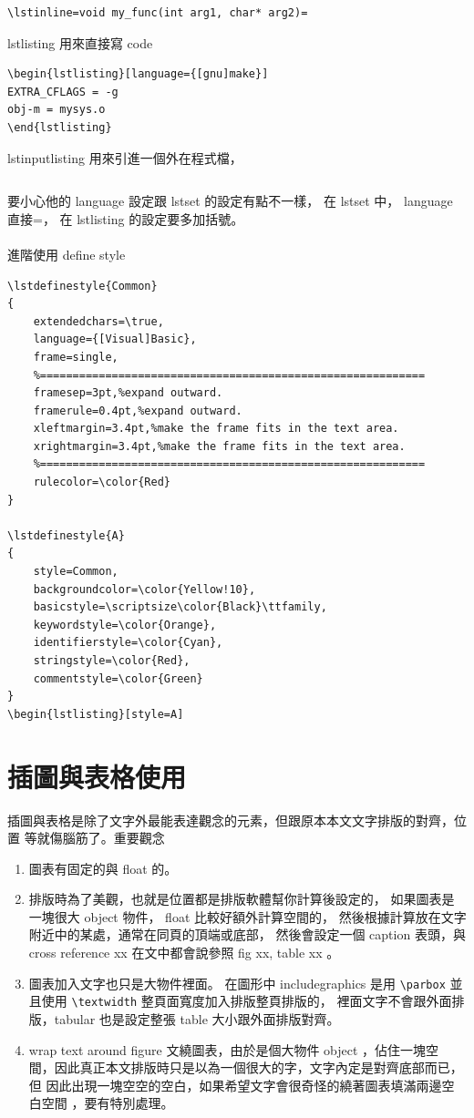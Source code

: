 \begin{verbatim}
\lstinline=void my_func(int arg1, char* arg2)=
\end{verbatim}
lstlisting 用來直接寫 code
\begin{verbatim}
\begin{lstlisting}[language={[gnu]make}]
EXTRA_CFLAGS = -g
obj-m = mysys.o
\end{lstlisting}
\end{verbatim}
lstinputlisting 用來引進一個外在程式檔，
\begin{verbatim}

\end{verbatim}
要小心他的 language 設定跟 lstset 的設定有點不一樣， 在 lstset 中，
language 直接=， 在 lstlisting 的設定要多加括號。
\\\\
進階使用 define style
\begin{verbatim}
\lstdefinestyle{Common}
{
    extendedchars=\true,
    language={[Visual]Basic},
    frame=single,
    %===========================================================
    framesep=3pt,%expand outward.
    framerule=0.4pt,%expand outward.
    xleftmargin=3.4pt,%make the frame fits in the text area. 
    xrightmargin=3.4pt,%make the frame fits in the text area.
    %=========================================================== 
    rulecolor=\color{Red}
}

\lstdefinestyle{A}
{
    style=Common,
    backgroundcolor=\color{Yellow!10},
    basicstyle=\scriptsize\color{Black}\ttfamily,
    keywordstyle=\color{Orange},
    identifierstyle=\color{Cyan},
    stringstyle=\color{Red},
    commentstyle=\color{Green}
}
\begin{lstlisting}[style=A]
\end{verbatim}

\section{插圖與表格使用}
插圖與表格是除了文字外最能表達觀念的元素，但跟原本本文文字排版的對齊，位置
等就傷腦筋了。重要觀念
\begin{enumerate}
\item 圖表有固定的與 float 的。
\item 排版時為了美觀，也就是位置都是排版軟體幫你計算後設定的， 
如果圖表是一塊很大 object 物件， float 比較好額外計算空間的，
然後根據計算放在文字附近中的某處，通常在同頁的頂端或底部，
然後會設定一個 caption 表頭，與 cross reference xx
在文中都會說參照 fig xx, table xx 。
\item 圖表加入文字也只是大物件裡面。 在圖形中 includegraphics 是用
\verb=\parbox= 並且使用 \verb=\textwidth= 整頁面寬度加入排版整頁排版的，
裡面文字不會跟外面排版，tabular 也是設定整張 table 大小跟外面排版對齊。
\item wrap text around figure 文繞圖表，由於是個大物件 object ，佔住一塊空
間，因此真正本文排版時只是以為一個很大的字，文字內定是對齊底部而已，但
因此出現一塊空空的空白，如果希望文字會很奇怪的繞著圖表填滿兩邊空白空間
，要有特別處理。  
\end{enumerate}

